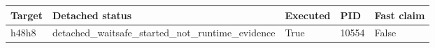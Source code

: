 {\small
\begin{tabular}{lllll}
\hline
Target & Detached status & Executed & PID & Fast claim \\
\hline
h48h8 & detached\_waitsafe\_started\_not\_runtime\_evidence & True & 10554 & False \\
\hline
\end{tabular}
}
